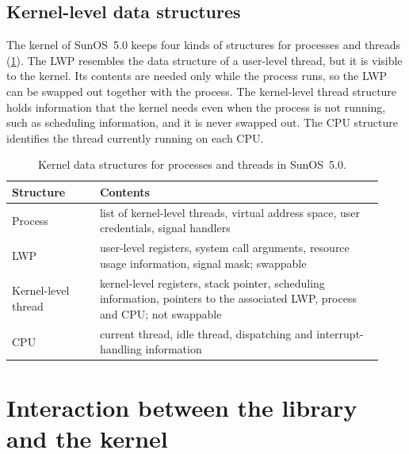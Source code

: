 \documentclass[../main.tex]{subfiles}
\begin{document}
\subsection{Kernel-level data structures}

The kernel of SunOS~5.0 keeps four kinds of structures for processes and
threads (\cref{tab:l05-kernel-structs}).  The LWP resembles the data
structure of a user-level thread, but it is visible to the kernel.  Its
contents are needed only while the process runs, so the LWP can be swapped
out together with the process.  The kernel-level thread structure holds
information that the kernel needs even when the process is not running,
such as scheduling information, and it is never swapped out.  The CPU
structure identifies the thread currently running on each
CPU.

\begin{table}[htbp]
  \centering
  \caption{Kernel data structures for processes and threads in SunOS~5.0.}
  \label{tab:l05-kernel-structs}
  \small
  \begin{tabular}{@{}>{\raggedright\arraybackslash}p{0.22\linewidth}>{\raggedright\arraybackslash}p{0.71\linewidth}@{}}
    \toprule
    Structure & Contents \\
    \midrule
    Process & list of kernel-level threads, virtual address space, user
      credentials, signal handlers \\
    LWP & user-level registers, system call arguments, resource usage
      information, signal mask; swappable \\
    Kernel-level thread & kernel-level registers, stack pointer,
      scheduling information, pointers to the associated LWP, process and
      CPU; not swappable \\
    CPU & current thread, idle thread, dispatching and
      interrupt-handling information \\
    \bottomrule
  \end{tabular}
\end{table}

\section{Interaction between the library and the kernel}
\label{sec:l05-interaction}
\end{document}
